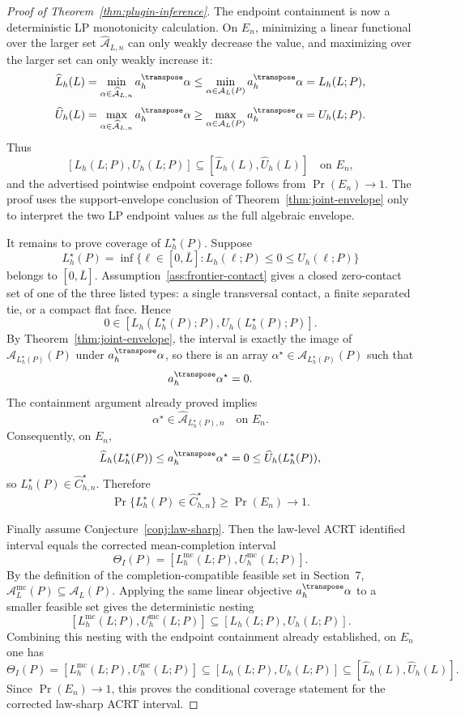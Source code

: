 \begin{proof}[Proof of Theorem~\ref{thm:plugin-inference}]
The endpoint containment is now a deterministic LP monotonicity calculation.
On \(E_n\), minimizing a linear functional over the larger set
\(\widehat{\mathcal A}_{L,n}\) can only weakly decrease the value, and
maximizing over the larger set can only weakly increase it:
\[
  \widehat L_h(L)
  =
  \min_{\alpha\in\widehat{\mathcal A}_{L,n}}a_h^\transpose\alpha
  \le
  \min_{\alpha\in\mathcal A_L(P)}a_h^\transpose\alpha
  =
  L_h(L;P),
\]
\[
  \widehat U_h(L)
  =
  \max_{\alpha\in\widehat{\mathcal A}_{L,n}}a_h^\transpose\alpha
  \ge
  \max_{\alpha\in\mathcal A_L(P)}a_h^\transpose\alpha
  =
  U_h(L;P).
\]
Thus
\[
  [L_h(L;P),U_h(L;P)]
  \subseteq
  [\widehat L_h(L),\widehat U_h(L)]
  \quad\text{on }E_n,
\]
and the advertised pointwise endpoint coverage follows from
\(\Pr(E_n)\to1\).  The proof uses the support-envelope conclusion of
Theorem~\ref{thm:joint-envelope} only to interpret the two LP endpoint values
as the full algebraic envelope.

It remains to prove coverage of \(L_h^\star(P)\).  Suppose
\[
  L_h^\star(P)=\inf\{\ell\in[0,\bar L]:L_h(\ell;P)\le0\le U_h(\ell;P)\}
\]
belongs to \([0,\bar L]\).  Assumption~\ref{ass:frontier-contact} gives a
closed zero-contact set of one of the three listed types: a single
transversal contact, a finite separated tie, or a compact flat face.  Hence
\[
  0\in[L_h(L_h^\star(P);P),U_h(L_h^\star(P);P)] .
\]
By Theorem~\ref{thm:joint-envelope}, the interval is exactly the image of
\(\mathcal A_{L_h^\star(P)}(P)\) under \(a_h^\transpose\alpha\), so there is
an array \(\alpha^\star\in\mathcal A_{L_h^\star(P)}(P)\) such that
\[
  a_h^\transpose\alpha^\star=0 .
\]
The containment argument already proved implies
\[
  \alpha^\star\in\widehat{\mathcal A}_{L_h^\star(P),n}
  \quad\text{on }E_n .
\]
Consequently, on \(E_n\),
\[
  \widehat L_h(L_h^\star(P))
  \le
  a_h^\transpose\alpha^\star
  =
  0
  \le
  \widehat U_h(L_h^\star(P)),
\]
so \(L_h^\star(P)\in\widehat C_{h,n}^\star\).  Therefore
\[
  \Pr\{L_h^\star(P)\in\widehat C_{h,n}^\star\}\ge \Pr(E_n)\to1 .
\]

Finally assume Conjecture~\ref{conj:law-sharp}.  Then the law-level ACRT
identified interval equals the corrected mean-completion interval
\[
  \Theta_I(P)
  =
  [L_h^{\mathrm{mc}}(L;P),U_h^{\mathrm{mc}}(L;P)] .
\]
By the definition of the completion-compatible feasible set in Section~7,
\(\mathcal A_L^{\mathrm{mc}}(P)\subseteq\mathcal A_L(P)\).  Applying the
same linear objective \(a_h^\transpose\alpha\) to a smaller feasible set gives
the deterministic nesting
\[
  [L_h^{\mathrm{mc}}(L;P),U_h^{\mathrm{mc}}(L;P)]
  \subseteq
  [L_h(L;P),U_h(L;P)] .
\]
Combining this nesting with the endpoint containment already established,
on \(E_n\) one has
\[
  \Theta_I(P)
  =
  [L_h^{\mathrm{mc}}(L;P),U_h^{\mathrm{mc}}(L;P)]
  \subseteq
  [L_h(L;P),U_h(L;P)]
  \subseteq
  [\widehat L_h(L),\widehat U_h(L)] .
\]
Since \(\Pr(E_n)\to1\), this proves the conditional coverage statement for
the corrected law-sharp ACRT interval.
\end{proof}

